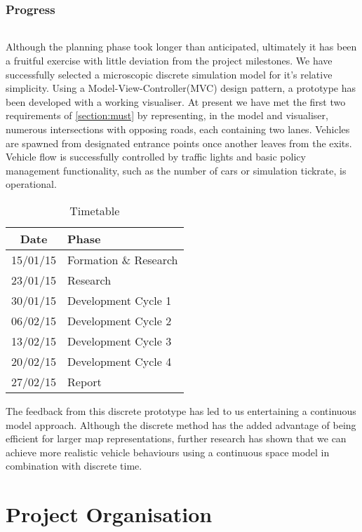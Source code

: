 \documentclass[11pt,a4paper]{article}
\begin{document}
\section{Progress}
\paragraph{}
Although the planning phase took longer than anticipated, ultimately it has been a fruitful exercise with little deviation from the project milestones.  We have successfully selected a microscopic discrete simulation model for it's relative simplicity.  Using a Model-View-Controller(MVC) design pattern, a prototype has been developed with a working visualiser.  At present we have met the first two requirements of \ref{section:must} by representing, in the model and visualiser, numerous intersections with opposing roads, each containing two lanes.  Vehicles are spawned from designated entrance points once another leaves from the exits.  Vehicle flow is successfully controlled by traffic lights and basic policy management functionality, such as the number of cars or simulation tickrate, is operational.
 
\begin{wraptable}{r}{6cm}
	\begin{tabular}{|c|l|}
	\hline
	\textbf{Date} & \textbf{Phase} \\ \hline
	15/01/15 & Formation \& Research \\ \hline
	23/01/15 & Research \\ \hline
	30/01/15 & Development Cycle 1 \\ \hline
	06/02/15 & Development Cycle 2 \\ \hline
	13/02/15 & Development Cycle 3 \\ \hline
	20/02/15 & Development Cycle 4 \\ \hline
	27/02/15 & Report \\ \hline
	\end{tabular}
	\caption{Timetable}
\end{wraptable}

The feedback from this discrete prototype has led to us entertaining a continuous model approach.  Although the discrete method has the added advantage of being efficient for larger map representations, further research has shown that we can achieve more realistic vehicle behaviours using a continuous space model in combination with discrete time.


\part{Project Organisation}
\end{document}
